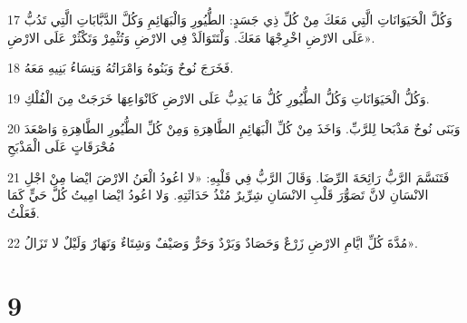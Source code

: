 \par 17 وَكُلَّ الْحَيَوَانَاتِ الَّتِي مَعَكَ مِنْ كُلِّ ذِي جَسَدٍ: الطُّيُورِ وَالْبَهَائِمِ وَكُلَّ الدَّبَّابَاتِ الَّتِي تَدُبُّ عَلَى الارْضِ اخْرِجْهَا مَعَكَ. وَلْتَتَوَالَدْ فِي الارْضِ وَتُثْمِرْ وَتَكْثُرْ عَلَى الارْضِ».
\par 18 فَخَرَجَ نُوحٌ وَبَنُوهُ وَامْرَاتُهُ وَنِسَاءُ بَنِيهِ مَعَهُ.
\par 19 وَكُلُّ الْحَيَوَانَاتِ وَكُلُّ الطُّيُورِ كُلُّ مَا يَدِبُّ عَلَى الارْضِ كَانْوَاعِهَا خَرَجَتْ مِنَ الْفُلْكِ.
\par 20 وَبَنَى نُوحٌ مَذْبَحا لِلرَّبِّ. وَاخَذَ مِنْ كُلِّ الْبَهَائِمِ الطَّاهِرَةِ وَمِنْ كُلِّ الطُّيُورِ الطَّاهِرَةِ وَاصْعَدَ مُحْرَقَاتٍ عَلَى الْمَذْبَحِ
\par 21 فَتَنَسَّمَ الرَّبُّ رَائِحَةَ الرِّضَا. وَقَالَ الرَّبُّ فِي قَلْبِهِ: «لا اعُودُ الْعَنُ الارْضَ ايْضا مِنْ اجْلِ الانْسَانِ لانَّ تَصَوُّرَ قَلْبِ الانْسَانِ شِرِّيرٌ مُنْذُ حَدَاثَتِهِ. وَلا اعُودُ ايْضا امِيتُ كُلَّ حَيٍّ كَمَا فَعَلْتُ.
\par 22 مُدَّةَ كُلِّ ايَّامِ الارْضِ زَرْعٌ وَحَصَادٌ وَبَرْدٌ وَحَرٌّ وَصَيْفٌ وَشِتَاءٌ وَنَهَارٌ وَلَيْلٌ لا تَزَالُ».

\chapter{9}

